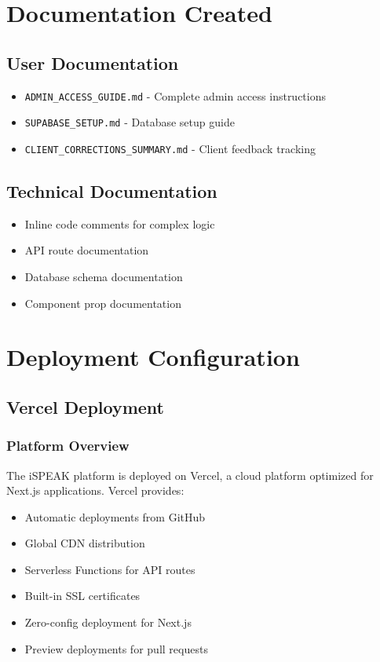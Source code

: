 \documentclass[11pt,a4paper]{article}
\begin{document}
\section{Documentation Created}

\subsection{User Documentation}
\begin{itemize}[leftmargin=*,itemsep=5pt]
    \item \texttt{ADMIN\_ACCESS\_GUIDE.md} - Complete admin access instructions
    \item \texttt{SUPABASE\_SETUP.md} - Database setup guide
    \item \texttt{CLIENT\_CORRECTIONS\_SUMMARY.md} - Client feedback tracking
\end{itemize}

\subsection{Technical Documentation}
\begin{itemize}[leftmargin=*,itemsep=5pt]
    \item Inline code comments for complex logic
    \item API route documentation
    \item Database schema documentation
    \item Component prop documentation
\end{itemize}

\section{Deployment Configuration}

\subsection{Vercel Deployment}
\subsubsection{Platform Overview}
The iSPEAK platform is deployed on Vercel, a cloud platform optimized for Next.js applications. Vercel provides:
\begin{itemize}[leftmargin=*,itemsep=3pt]
    \item Automatic deployments from GitHub
    \item Global CDN distribution
    \item Serverless Functions for API routes
    \item Built-in SSL certificates
    \item Zero-config deployment for Next.js
    \item Preview deployments for pull requests
\end{itemize}
\end{document}
